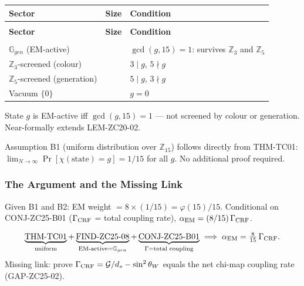 \documentclass[12pt, a4paper]{article}
\begin{document}
\begin{formalbox}[title={FIND-ZC25-08: EM-Active Slots from
  Coprimality}]
{\small
\setlength{\LTpre}{4pt}
\setlength{\LTpost}{4pt}
\renewcommand{\arraystretch}{1.30}
\begin{longtable}{>{\raggedright\arraybackslash}p{3.5cm}
                  >{\centering\arraybackslash}p{1.5cm}
                  >{\raggedright\arraybackslash}p{7.0cm}}
\toprule
\textbf{Sector} & \textbf{Size} & \textbf{Condition} \\
\midrule
\endfirsthead
\multicolumn{3}{l}{\small\textit{(continued)}}\\[4pt]
\toprule
\textbf{Sector} & \textbf{Size} & \textbf{Condition} \\
\midrule
\endhead
\midrule
\multicolumn{3}{r}{\small\textit{(continues)}}\\
\endfoot
\bottomrule
\endlastfoot
$\mathbb{G}_{gen}$ (EM-active)
  & 8 & $\gcd(g,15)=1$: survives $\mathbb{Z}_3$ and $\mathbb{Z}_5$ \\
$\mathbb{Z}_3$-screened (colour)  & 4 & $3\mid g$, $5\nmid g$ \\
$\mathbb{Z}_5$-screened (generation) & 2 & $5\mid g$, $3\nmid g$ \\
Vacuum $\{0\}$ & 1 & $g = 0$ \\
\end{longtable}
}
\vspace{-6pt}
State $g$ is EM-active iff $\gcd(g,15)=1$ --- not screened by
colour or generation. Near-formally extends LEM-ZC20-02.
\end{formalbox}

\begin{derivedbox}[title={FIND-ZC25-07: B1 Proved by THM-TC01}]
Assumption B1 (uniform distribution over $\mathbb{Z}_{15}$) follows
directly from THM-TC01: $\lim_{N\to\infty}\Pr[\chi(\text{state})=g]
= 1/15$ for all $g$. No additional proof required.
\end{derivedbox}

\subsubsection{The Argument and the Missing Link}

Given B1 and B2: EM weight $= 8\times(1/15) = \varphi(15)/15$.
Conditional on CONJ-ZC25-B01 ($\Gamma_{\rm CRF}$ = total coupling
rate), $\alpha_{\rm EM} = (8/15)\,\Gamma_{\rm CRF}$.

\begin{derivedbox}[title={FIND-ZC25-09: One Missing Link}]
\[
  \underbrace{\text{THM-TC01}}_{\text{uniform}}
  +\underbrace{\text{FIND-ZC25-08}}_{\text{EM-active}=\mathbb{G}_{gen}}
  +\underbrace{\text{CONJ-ZC25-B01}}_{\Gamma=\text{total coupling}}
  \;\Longrightarrow\;
  \alpha_{\rm EM} = \tfrac{8}{15}\,\Gamma_{\rm CRF}.
\]
Missing link: prove $\Gamma_{\rm CRF} = \mathcal{G}/d_s -
\sin^2\theta_W$ equals the net chi-map coupling rate
(GAP-ZC25-02).
\end{derivedbox}
\end{document}
